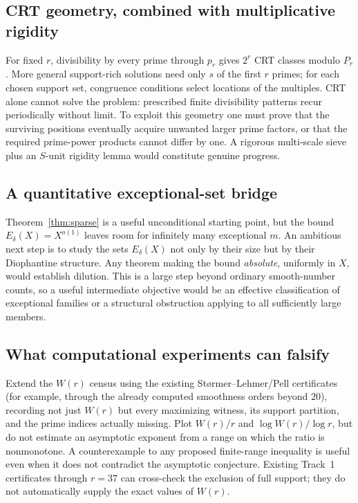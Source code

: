 \documentclass[11pt,letterpaper]{article}
\theoremstyle{remark}
\begin{document}
\subsection{CRT geometry, combined with multiplicative rigidity}
For fixed $r$, divisibility by every prime through $p_r$ gives
$2^r$ CRT classes modulo $P_r$. More general support-rich solutions
need only $s$ of the first $r$ primes; for each chosen support set,
congruence conditions select locations of the multiples.
CRT alone cannot solve the problem: prescribed finite divisibility
patterns recur periodically without limit. To exploit this geometry
one must prove that the surviving positions eventually acquire
unwanted larger prime factors, or that the required prime-power
products cannot differ by one. A rigorous multi-scale sieve plus
an $S$-unit rigidity lemma would constitute genuine progress.

\subsection{A quantitative exceptional-set bridge}
Theorem~\ref{thm:sparse} is a useful unconditional starting point,
but the bound $E_\delta(X)=X^{o(1)}$ leaves room for infinitely
many exceptional $m$. An ambitious next step is to study the
sets $E_\delta(X)$ not only by their size but by their Diophantine
structure. Any theorem making the bound \emph{absolute}, uniformly
in $X$, would establish dilution. This is a large step beyond
ordinary smooth-number counts, so a useful intermediate objective
would be an effective classification of exceptional families
or a structural obstruction applying to all sufficiently large members.

\subsection{What computational experiments can falsify}
Extend the $W(r)$ census using the existing St\o rmer--Lehmer/Pell
certificates (for example, through the already computed smoothness
orders beyond $20$), recording not just $W(r)$ but every maximizing
witness, its support partition, and the prime indices actually
missing. Plot $W(r)/r$ and $\log W(r)/\log r$, but do not estimate
an asymptotic exponent from a range on which the ratio is
nonmonotone. A counterexample to any proposed finite-range
inequality is useful even when it does not contradict the
asymptotic conjecture. Existing Track~1 certificates through
$r=37$ can cross-check the exclusion of full support; they do
not automatically supply the exact values of $W(r)$.
\end{document}
